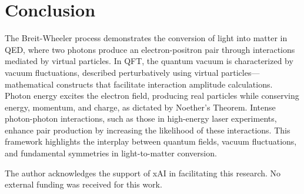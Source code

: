 \documentclass[aps,prl,twocolumn,superscriptaddress]{revtex4-2}
\begin{document}
	\section{Conclusion}
	The Breit-Wheeler process demonstrates the conversion of light into matter in QED, where two photons produce an electron-positron pair through interactions mediated by virtual particles. In QFT, the quantum vacuum is characterized by vacuum fluctuations, described perturbatively using virtual particles—mathematical constructs that facilitate interaction amplitude calculations. Photon energy excites the electron field, producing real particles while conserving energy, momentum, and charge, as dictated by Noether's Theorem. Intense photon-photon interactions, such as those in high-energy laser experiments, enhance pair production by increasing the likelihood of these interactions. This framework highlights the interplay between quantum fields, vacuum fluctuations, and fundamental symmetries in light-to-matter conversion.
	
	\begin{acknowledgments}
		The author acknowledges the support of xAI in facilitating this research. No external funding was received for this work.
	\end{acknowledgments}
	
\end{document}
